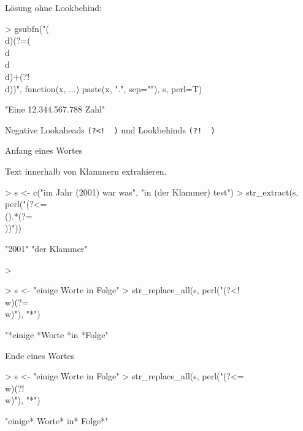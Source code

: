 \documentclass[a4paper]{report}
\begin{document}
Lösung ohne Lookbehind:

\begin{Schunk}
\begin{Sinput}
> gsubfn("(\\d)(?=(\\d\\d\\d)+(?!\\d))", function(x, ...) 
   paste(x, ".", sep=""), s, perl=T)
\end{Sinput}
\begin{Soutput}
[1] "Eine 12.344.567.788 Zahl"
\end{Soutput}
\end{Schunk}

Negative Lookaheads \verb,(?<!  ), und Lookbehinds \verb,(?!  ),

Anfang eines Wortes

Text innerhalb von Klammern extrahieren.

\begin{Schunk}
\begin{Sinput}
> s <- c("im Jahr (2001) war was", "in (der Klammer) test")
> str_extract(s, perl("(?<=\\().*(?=\\))"))
\end{Sinput}
\begin{Soutput}
[1] "2001"        "der Klammer"
\end{Soutput}
\begin{Sinput}
> 
\end{Sinput}
\end{Schunk}

\begin{Schunk}
\begin{Sinput}
> s <- "einige Worte in Folge"
> str_replace_all(s, perl("(?<!\\w)(?=\\w)"), "*")
\end{Sinput}
\begin{Soutput}
[1] "*einige *Worte *in *Folge"
\end{Soutput}
\end{Schunk}
          
Ende eines Wortes

\begin{Schunk}
\begin{Sinput}
> s <- "einige Worte in Folge"
> str_replace_all(s, perl("(?<=\\w)(?!\\w)"), "*")
\end{Sinput}
\begin{Soutput}
[1] "einige* Worte* in* Folge*"
\end{Soutput}
\end{Schunk}
\end{document}
